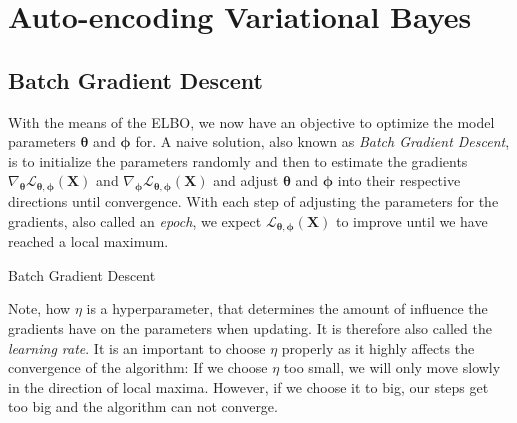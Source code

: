 \documentclass[12pt]{report}
\begin{document}
\section{Auto-encoding Variational Bayes}
\subsection{Batch Gradient Descent}
With the means of the ELBO, we now have an objective to optimize the model parameters $\pmb{\theta}$ and $\pmb{\phi}$ for. A naive solution, also known as \emph{Batch Gradient Descent}, is to initialize the parameters randomly and then to estimate the gradients $\nabla_{\pmb{\theta}}\mathcal{L}_{\pmb{\theta}, \pmb{\phi}}(\mathbf{X})$ and $\nabla_{\pmb{\pmb{\phi}}}\mathcal{L}_{\pmb{\theta}, \pmb{\phi}}(\mathbf{X})$ and adjust $\pmb{\theta}$ and $\pmb{\phi}$ into their respective directions until convergence. With each step of adjusting the parameters for the gradients, also called an \emph{epoch}, we expect $\mathcal{L}_{\pmb{\theta}, \pmb{\phi}}(\mathbf{X})$ to improve until we have reached a local maximum. 

\begin{algorithm}[H]
\SetAlgoLined
{}
\caption{Batch Gradient Descent}
\end{algorithm} 

Note, how $\eta$ is a hyperparameter, that determines the amount of influence the gradients have on the parameters when updating. It is therefore also called the \emph{learning rate}. It is an important to choose $\eta$ properly as it highly affects the convergence of the algorithm: If we choose $\eta$ too small, we will only move slowly in the direction of local maxima. However, if we choose it to big, our steps get too big and the algorithm can not converge. 
\end{document}
